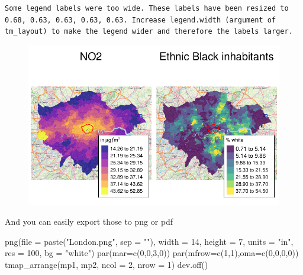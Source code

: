 \documentclass[
  letterpaper,
  DIV=11,
  numbers=noendperiod]{scrreprt}
\newenvironment{Shaded}{\begin{snugshade}}{\end{snugshade}}
\newcommand{\AttributeTok}[1]{\textcolor[rgb]{0.40,0.45,0.13}{#1}}
\newcommand{\DecValTok}[1]{\textcolor[rgb]{0.68,0.00,0.00}{#1}}
\newcommand{\FunctionTok}[1]{\textcolor[rgb]{0.28,0.35,0.67}{#1}}
\newcommand{\NormalTok}[1]{\textcolor[rgb]{0.00,0.23,0.31}{#1}}
\newcommand{\StringTok}[1]{\textcolor[rgb]{0.13,0.47,0.30}{#1}}
\begin{document}
\begin{verbatim}
Some legend labels were too wide. These labels have been resized to 0.68, 0.63, 0.63, 0.63, 0.63. Increase legend.width (argument of tm_layout) to make the legend wider and therefore the labels larger.
\end{verbatim}

\begin{figure}[H]

{\centering \includegraphics{02_spatial-data_files/figure-pdf/unnamed-chunk-20-1.pdf}

}

\end{figure}

And you can easily export those to png or pdf

\begin{Shaded}
\begin{Highlighting}[]
\FunctionTok{png}\NormalTok{(}\AttributeTok{file =} \FunctionTok{paste}\NormalTok{(}\StringTok{"London.png"}\NormalTok{, }\AttributeTok{sep =} \StringTok{""}\NormalTok{), }\AttributeTok{width =} \DecValTok{14}\NormalTok{, }\AttributeTok{height =} \DecValTok{7}\NormalTok{, }\AttributeTok{units =} \StringTok{"in"}\NormalTok{, }
    \AttributeTok{res =} \DecValTok{100}\NormalTok{, }\AttributeTok{bg =} \StringTok{"white"}\NormalTok{)}
\FunctionTok{par}\NormalTok{(}\AttributeTok{mar=}\FunctionTok{c}\NormalTok{(}\DecValTok{0}\NormalTok{,}\DecValTok{0}\NormalTok{,}\DecValTok{3}\NormalTok{,}\DecValTok{0}\NormalTok{))}
\FunctionTok{par}\NormalTok{(}\AttributeTok{mfrow=}\FunctionTok{c}\NormalTok{(}\DecValTok{1}\NormalTok{,}\DecValTok{1}\NormalTok{),}\AttributeTok{oma=}\FunctionTok{c}\NormalTok{(}\DecValTok{0}\NormalTok{,}\DecValTok{0}\NormalTok{,}\DecValTok{0}\NormalTok{,}\DecValTok{0}\NormalTok{))}
\FunctionTok{tmap\_arrange}\NormalTok{(mp1, mp2, }\AttributeTok{ncol =} \DecValTok{2}\NormalTok{, }\AttributeTok{nrow =} \DecValTok{1}\NormalTok{)}
\FunctionTok{dev.off}\NormalTok{()}
\end{Highlighting}
\end{Shaded}
\end{document}
